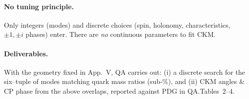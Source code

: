 \paragraph{No tuning principle.} Only integers (modes) and discrete choices (spin, holonomy, characteristics, $\pm1,\pm i$ phases) enter. There are \emph{no} continuous parameters to fit CKM.

\paragraph{Deliverables.} With the geometry fixed in App.~V, QA carries out: (i) a discrete search for the six–tuple of modes matching quark mass ratios (sub‑\%), and (ii) CKM angles \& CP phase from the above overlaps, reported against PDG in QA.Tables~2–4.
